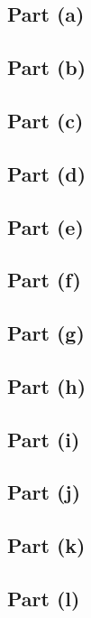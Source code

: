 \subsection{Part (a)}\label{sec:q-2-a}
\subsection{Part (b)}\label{sec:q-2-b}
\subsection{Part (c)}\label{sec:q-2-c}
\subsection{Part (d)}\label{sec:q-2-d}
\subsection{Part (e)}\label{sec:q-2-e}
\subsection{Part (f)}\label{sec:q-2-f}
\subsection{Part (g)}\label{sec:q-2-g}
\subsection{Part (h)}\label{sec:q-2-h}
\subsection{Part (i)}\label{sec:q-2-i}
\subsection{Part (j)}\label{sec:q-2-j}
\subsection{Part (k)}\label{sec:q-2-k}
\subsection{Part (l)}\label{sec:q-2-l}

